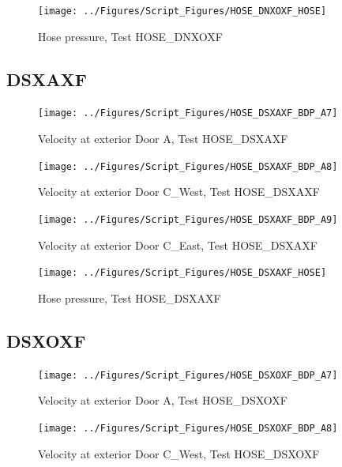 \documentclass[12pt,oneside]{book}
\begin{document}
\begin{figure}[!ht]
\texttt{[image: ../Figures/Script\_Figures/HOSE\_DNXOXF\_HOSE]}
\caption{Hose pressure, Test HOSE\_DNXOXF}
\label{fig:HOSE_DNXOXF_HOSE}
\end{figure}


\clearpage


\subsection{DSXAXF}

\begin{figure}[!ht]
\texttt{[image: ../Figures/Script\_Figures/HOSE\_DSXAXF\_BDP\_A7]}
\caption{Velocity at exterior Door A, Test HOSE\_DSXAXF}
\label{fig:HOSE_DSXAXF_BDP_A7}
\end{figure}

\begin{figure}[!ht]
\texttt{[image: ../Figures/Script\_Figures/HOSE\_DSXAXF\_BDP\_A8]}
\caption{Velocity at exterior Door C\_West, Test HOSE\_DSXAXF}
\label{fig:HOSE_DSXAXF_BDP_A8}
\end{figure}

\begin{figure}[!ht]
\texttt{[image: ../Figures/Script\_Figures/HOSE\_DSXAXF\_BDP\_A9]}
\caption{Velocity at exterior Door C\_East, Test HOSE\_DSXAXF}
\label{fig:HOSE_DSXAXF_BDP_A9}
\end{figure}

\begin{figure}[!ht]
\texttt{[image: ../Figures/Script\_Figures/HOSE\_DSXAXF\_HOSE]}
\caption{Hose pressure, Test HOSE\_DSXAXF}
\label{fig:HOSE_DSXAXF_HOSE}
\end{figure}


\clearpage


\subsection{DSXOXF}

\begin{figure}[!ht]
\texttt{[image: ../Figures/Script\_Figures/HOSE\_DSXOXF\_BDP\_A7]}
\caption{Velocity at exterior Door A, Test HOSE\_DSXOXF}
\label{fig:HOSE_DSXOXF_BDP_A7}
\end{figure}

\begin{figure}[!ht]
\texttt{[image: ../Figures/Script\_Figures/HOSE\_DSXOXF\_BDP\_A8]}
\caption{Velocity at exterior Door C\_West, Test HOSE\_DSXOXF}
\label{fig:HOSE_DSXOXF_BDP_A8}
\end{figure}
\end{document}
